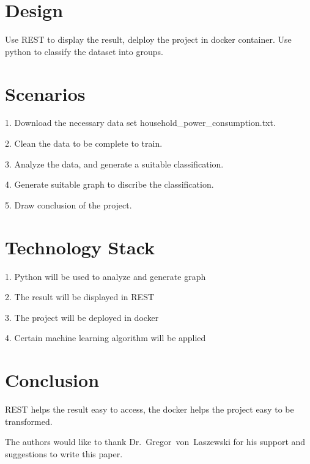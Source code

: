 \section{Design}

Use REST to display the result, delploy the project in docker container.
Use python to classify the dataset into groups.

\section{Scenarios}

1. Download the necessary data set household\_power\_consumption.txt\cite{editor00}.

2. Clean the data to be complete to train.

3. Analyze the data, and generate a suitable classification.

4. Generate suitable graph to discribe the classification.

5. Draw conclusion of the project.


\section{Technology Stack}

1. Python will be used to analyze and generate graph

2. The result will be displayed in REST

3. The project will be deployed in docker

4. Certain machine learning algorithm will be applied


\section{Conclusion}

REST helps the result easy to access, the docker helps the project easy to be transformed.


\begin{acks}

  The authors would like to thank Dr.~Gregor~von~Laszewski for his
  support and suggestions to write this paper.

\end{acks}



 

